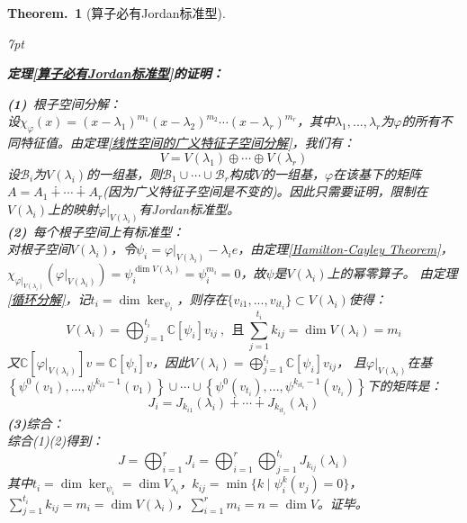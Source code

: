 \documentclass[zihao=5,UTF8]{report}
\theoremstyle{mystyle} %
\newtheorem{theorem}{Theorem.\,}
\newenvironment{graybox}{%
\def\FrameCommand{%
\hspace{1pt}%
{\color{gray}\small \vrule width 2pt}%
{\color{graybox_color}\vrule width 4pt}%
\colorbox{graybox_color}%
}%
\MakeFramed{\advance\hsize-\width\FrameRestore}%
\noindent\hspace{-4.55pt}%
\begin{adjustwidth}{}{7pt}%
\vspace{2pt}\vspace{2pt}%
}
{%
\vspace{2pt}\end{adjustwidth}\endMakeFramed%
}
\begin{document}
\begin{theorem}[算子必有Jordan标准型]
\noindent
\begin{graybox}
\textbf{定理\ref{算子必有Jordan标准型}的证明：}\par
\noindent 
\textbf{(1)}\ 根子空间分解：\\
设$\chi_{\varphi}(x) = (x-\lambda_1)^{m_1}(x-\lambda_2)^{m_2} \cdots (x-\lambda_r)^{m_r}$，其中$\lambda_1,...,\lambda_r$为$\varphi$的所有不同特征值。由定理\ref{线性空间的广义特征子空间分解}，我们有：
\begin{equation*}
    V = V(\lambda_1) \oplus \cdots \oplus V(\lambda_r)
\end{equation*}
设$\mathcal{B}_i$为$V(\lambda_i)$的一组基，则$\mathcal{B}_1 \cup \cdots \cup \mathcal{B}_r$构成$V$的一组基，$\varphi$在该基下的矩阵$A = A_1 \dotplus \cdots \dotplus A_r$(因为广义特征子空间是不变的)。因此只需要证明，限制在$V(\lambda_i)$上的映射$\varphi|_{V(\lambda_i)}$有Jordan标准型。\\
\textbf{(2)}\ 每个根子空间上有标准型：\\
对根子空间$V(\lambda_i)$，令$\psi_i = \varphi|_{V(\lambda_i)} - \lambda_i e$，由定理\ref{Hamilton-Cayley Theorem}，
$\chi_{\varphi|_{V(\lambda_i)}}(\varphi|_{V(\lambda_i)}) = \psi_i^{\dim V(\lambda_i)} = \psi_i^{m_i} = 0$，故$\psi$是$V(\lambda_i)$上的幂零算子。
由定理\ref{循环分解}，记$t_i = \dim \ker_{\psi_i}$，则存在$\{v_{i1},...,v_{it_i}\} \subset V(\lambda_i) $使得：
\begin{equation*}
    V(\lambda_i) =  \bigoplus_{j =1}^{t_i}\mathbb{C}[\psi_i]v_{ij}\ ,\ \ \text{且}\ \sum_{j=1}^{t_i}k_{ij}= \dim V(\lambda_i) = m_i
\end{equation*}
又$\mathbb{C}[\varphi|_{V(\lambda_i)}]v = \mathbb{C}[\psi_i]v$，因此$V(\lambda_i) =  \bigoplus_{j =1}^{t_i}\mathbb{C}[\psi_i]v_{ij}$，
且$\varphi|_{V(\lambda_i)}$在基$\left\{\psi^0 (v_1),...,\psi^{k_{i1}-1}(v_1)\right\} \cup \cdots \cup \left\{\psi^0 (v_{t_i}),...,\psi^{k_{it_i}-1}(v_{t_i})\right\}$下的矩阵是：
\begin{equation*}
    J_i = J_{k_{i1}}(\lambda_i) \dotplus \cdots \dotplus J_{k_{it_i}}(\lambda_i)
\end{equation*}
\textbf{(3)}综合：\\
综合(1)(2)得到：
\begin{equation*}
    J = \bigoplus_{i=1}^{r}J_i = \bigoplus_{i=1}^{r}\bigoplus_{j=1}^{t_i} J_{k_{ij}}(\lambda_i)
\end{equation*}
其中$t_i = \dim \ker_{\psi_i} = \dim V_{\lambda_i}$，$k_{ij}= \min \{k\mid \psi_i^k(v_j) = 0 \}$，$\sum_{j=1}^{t_i} k_{ij} = m_i = \dim V(\lambda_i)$，$\sum_{i=1}^{r}m_i = n = \dim V$。证毕。
\end{graybox}
\end{theorem}
\end{document}

